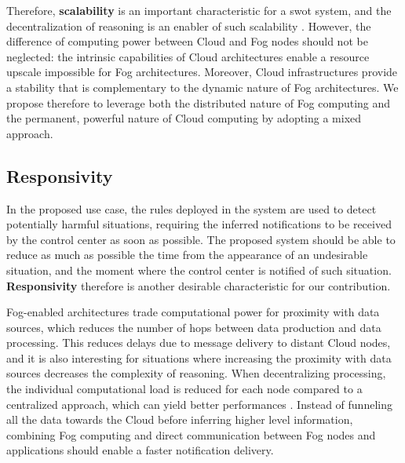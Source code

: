 \documentclass[sw]{iosart2x}
\begin{document}
Therefore, \textbf{scalability} is an important characteristic for a \gls{swot} system, and the decentralization of reasoning is an enabler of such scalability \cite{Maarala2017}.
However, the difference of computing power between Cloud and Fog nodes should not be neglected: the intrinsic capabilities of Cloud architectures enable a resource upscale impossible for Fog architectures.
Moreover, Cloud infrastructures provide a stability that is complementary to the dynamic nature of Fog architectures.
We propose therefore to leverage both the distributed nature of Fog computing and the permanent, powerful nature of Cloud computing by adopting a mixed approach. 

\subsection{Responsivity}

In the proposed use case, the rules deployed in the system are used to detect potentially harmful situations, requiring the inferred notifications to be received by the control center as soon as possible. 
The proposed system should be able to reduce as much as possible the time from the appearance of an undesirable situation, and the moment where the control center is notified of such situation.
\textbf{Responsivity} therefore is another desirable characteristic for our contribution.

Fog-enabled architectures trade computational power for proximity with data sources, which reduces the number of hops between data production and data processing. 
This reduces delays due to message delivery to distant Cloud nodes, and it is also interesting for situations where increasing the proximity with data sources decreases the complexity of reasoning.
When decentralizing processing, the individual computational load is reduced for each node compared to a centralized approach, which can yield better performances \cite{Su2018}.
Instead of funneling all the data towards the Cloud before inferring higher level information, combining Fog computing and direct communication between Fog nodes and applications should enable a faster notification delivery.

%
%
%
\end{document}
